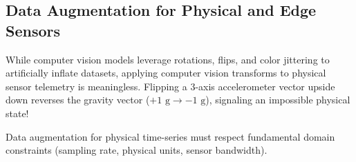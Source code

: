 \subsection{Data Augmentation for Physical and Edge Sensors}\label{subsec:data_augmentation}

While computer vision models leverage rotations, flips, and color jittering to artificially inflate datasets, applying computer vision transforms to physical sensor telemetry is meaningless. Flipping a 3-axis accelerometer vector upside down reverses the gravity vector ($+1\text{ g} \to -1\text{ g}$), signaling an impossible physical state!

Data augmentation for physical time-series must respect fundamental domain constraints (sampling rate, physical units, sensor bandwidth).

